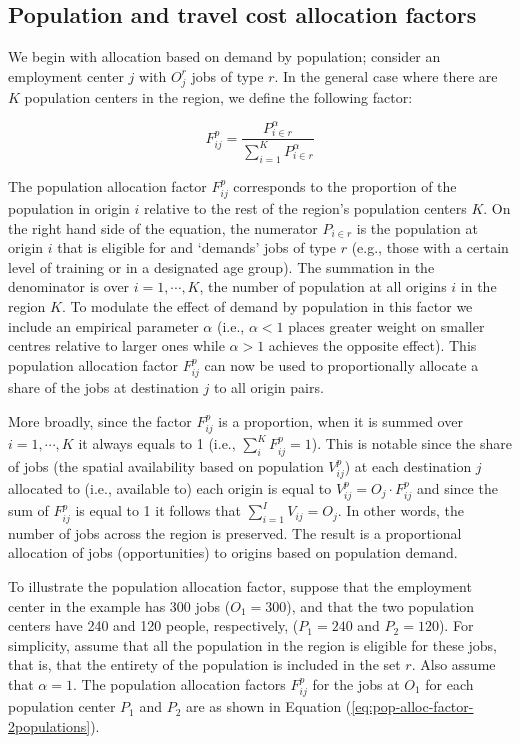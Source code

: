 \documentclass[]{elsarticle} %
\begin{document}
\hypertarget{population-and-travel-cost-allocation-factors}{%
\subsection{Population and travel cost allocation
factors}\label{population-and-travel-cost-allocation-factors}}

We begin with allocation based on demand by population; consider an
employment center \(j\) with \(O_j^r\) jobs of type \(r\). In the
general case where there are \(K\) population centers in the region, we
define the following factor:

\begin{equation}
\label{eq:pop-alloc-factor}
F^p_{ij} = \frac{P_{i\in r}^\alpha}{\sum_{i=1}^K P_{i\in r}^\alpha}
\end{equation}

The population allocation factor \(F^p_{ij}\) corresponds to the
proportion of the population in origin \(i\) relative to the rest of the
region's population centers \(K\). On the right hand side of the
equation, the numerator \(P_{i\in r}\) is the population at origin \(i\)
that is eligible for and `demands' jobs of type \(r\) (e.g., those with
a certain level of training or in a designated age group). The summation
in the denominator is over \(i=1,\cdots,K\), the number of population at
all origins \(i\) in the region \(K\). To modulate the effect of demand
by population in this factor we include an empirical parameter
\(\alpha\) (i.e., \(\alpha <1\) places greater weight on smaller centres
relative to larger ones while \(\alpha>1\) achieves the opposite
effect). This population allocation factor \(F^p_{ij}\) can now be used
to proportionally allocate a share of the jobs at destination \(j\) to
all origin pairs.

More broadly, since the factor \(F^p_{ij}\) is a proportion, when it is
summed over \(i=1,\cdots,K\) it always equals to 1 (i.e.,
\(\sum_i^{K} F^p_{ij} = 1\)). This is notable since the share of jobs
(the spatial availability based on population \(V^p_{ij}\)) at each
destination \(j\) allocated to (i.e., available to) each origin is equal
to \(V^p_{ij} = O_j \cdot F^p_{ij}\) and since the sum of \(F^p_{ij}\)
is equal to 1 it follows that \(\sum_{i=1}^I V_{ij} = O_j\). In other
words, the number of jobs across the region is preserved. The result is
a proportional allocation of jobs (opportunities) to origins based on
population demand.

To illustrate the population allocation factor, suppose that the
employment center in the example has 300 jobs (\(O_1= 300\)), and that
the two population centers have 240 and 120 people, respectively,
(\(P_1= 240\) and \(P_2 = 120\)). For simplicity, assume that all the
population in the region is eligible for these jobs, that is, that the
entirety of the population is included in the set \(r\). Also assume
that \(\alpha=1\). The population allocation factors \(F^p_{ij}\) for
the jobs at \(O_1\) for each population center \(P_1\) and \(P_2\) are
as shown in Equation (\ref{eq:pop-alloc-factor-2populations}).
\end{document}
